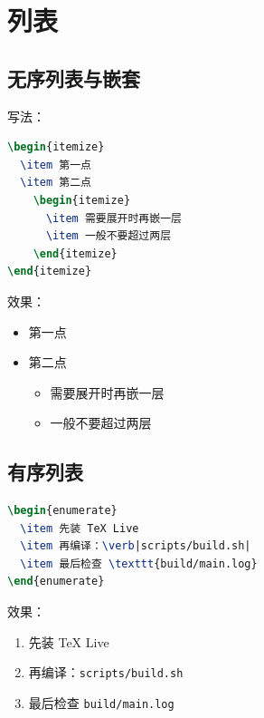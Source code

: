 \section{列表}
\label{sec:00-lists}

\subsection{无序列表与嵌套}

写法：

\begin{lstlisting}[language=TeX]
\begin{itemize}
  \item 第一点
  \item 第二点
    \begin{itemize}
      \item 需要展开时再嵌一层
      \item 一般不要超过两层
    \end{itemize}
\end{itemize}
\end{lstlisting}

效果：

\begin{itemize}
  \item 第一点
  \item 第二点
    \begin{itemize}
      \item 需要展开时再嵌一层
      \item 一般不要超过两层
    \end{itemize}
\end{itemize}

\subsection{有序列表}

\begin{lstlisting}[language=TeX]
\begin{enumerate}
  \item 先装 TeX Live
  \item 再编译：\verb|scripts/build.sh|
  \item 最后检查 \texttt{build/main.log}
\end{enumerate}
\end{lstlisting}

效果：

\begin{enumerate}
  \item 先装 TeX Live
  \item 再编译：\verb|scripts/build.sh|
  \item 最后检查 \texttt{build/main.log}
\end{enumerate}

